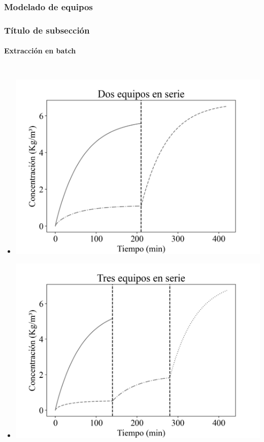 \documentclass[aspectratio=1610]{beamer}
\newcommand{\ssec}{Título de subsección}
\begin{document}
\subsubsection{Modelado de equipos}
\begin{frame}[t]
	\frametitle{\ssec}
	\framesubtitle{Extracción en batch}
	\begin{columns}
		\begin{itemize}
		\setlength\itemsep{-0.5em}
		\item[] \includegraphics[height=0.35\textheight]{figs/model-batch-serie-2.png}
		\item[] \includegraphics[height=0.35\textheight]{figs/model-batch-serie-3.png}
	\end{itemize}

\end{columns}
\end{frame}
\end{document}

